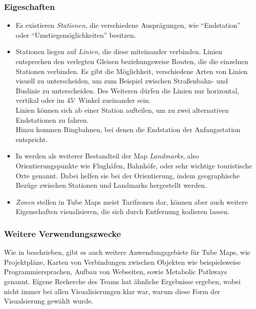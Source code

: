 \subsubsection{Eigeschaften}
\begin{itemize}
\item Es existieren \emph{Stationen}, die verschiedene Ausprägungen, wie "`Endstation"' oder "`Umstiegsmöglichkeiten"' besitzen. 

\item Stationen liegen auf \emph{Linien}, die diese miteinander verbinden. Linien entsprechen den verlegten Gleisen beziehungsweise Routen, die die einzelnen Stationen verbinden. Es gibt die Möglichkeit, verschiedene Arten von Linien visuell zu unterscheiden, um zum Beispiel zwischen Straßenbahn- und Buslinie zu unterscheiden. Des Weiteren dürfen die Linien nur horizontal, vertikal oder im 45$^{\circ}$ Winkel zueinander sein. \\
Linien können sich ab einer Station aufteilen, um zu zwei alternativen Endstationen zu fahren. \\ 
Hinzu kommen Ringbahnen, bei denen die Endstation der Anfangsstation entspricht.

\item In \cite{automaticlayoutmetro08} werden als weiterer Bestandteil der Map \emph{Landmarks}, also Orientierungspunkte wie Flughäfen, Bahnhöfe, oder sehr wichtige touristische Orte genannt. Dabei helfen sie bei der Orientierung, indem geographische Bezüge zwischen Stationen und Landmarks hergestellt werden.

\item \emph{Zonen} stellen in Tube Maps meist Tarifzonen dar, können aber auch weitere Eigenschaften visualisieren, die sich durch Entfernung kodieren lassen. 
\end{itemize}

\subsubsection{Weitere Verwendungszwecke}
\label{tm:verwendungszwecke}
Wie in \cite{automaticlayoutmetro08} beschrieben, gibt es auch weitere Anwendungsgebiete für Tube Maps, wie Projektpläne, Karten von Verbindungen zwischen Objekten wie beispielsweise Programmiersprachen, Aufbau von Webseiten, sowie Metabolic Pathways genannt. Eigene Recherche des Teams hat ähnliche Ergebnisse ergeben, wobei nicht immer bei allen Visualisierungen klar war, warum diese Form der Visualsierung gewählt wurde. 

